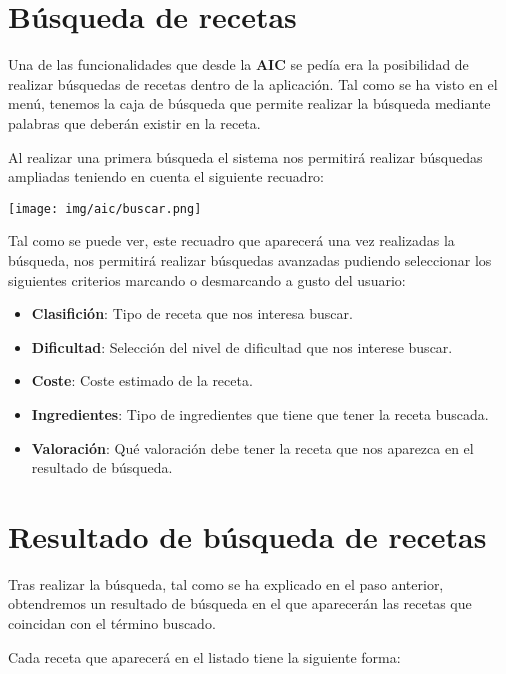 \documentclass{\ClassPath/viu-tfm-template}
\begin{document}
\section{Búsqueda de recetas}

Una de las funcionalidades que desde la \textbf{AIC} se pedía era la posibilidad de realizar búsquedas de recetas dentro de la aplicación. Tal como se ha visto en el menú, tenemos la caja de búsqueda que permite realizar la búsqueda mediante palabras que deberán existir en la receta.

Al realizar una primera búsqueda el sistema nos permitirá realizar búsquedas ampliadas teniendo en cuenta el siguiente recuadro:

    \begin{center}
        \vspace{-10pt}
        \texttt{[image: img/aic/buscar.png]}
        \vspace{-20pt}
    \end{center}

Tal como se puede ver, este recuadro que aparecerá una vez realizadas la búsqueda, nos permitirá realizar búsquedas avanzadas pudiendo seleccionar los siguientes criterios marcando o desmarcando a gusto del usuario:

\begin{itemize}
    \item \textbf{Clasifición}: Tipo de receta que nos interesa buscar.
    \item \textbf{Dificultad}: Selección del nivel de dificultad que nos interese buscar.
    \item \textbf{Coste}: Coste estimado de la receta.
    \item \textbf{Ingredientes}: Tipo de ingredientes que tiene que tener la receta buscada.
    \item \textbf{Valoración}: Qué valoración debe tener la receta que nos aparezca en el resultado de búsqueda.
\end{itemize}


\section{Resultado de búsqueda de recetas}

Tras realizar la búsqueda, tal como se ha explicado en el paso anterior, obtendremos un resultado de búsqueda en el que aparecerán las recetas que coincidan con el término buscado.

Cada receta que aparecerá en el listado tiene la siguiente forma:
\end{document}

